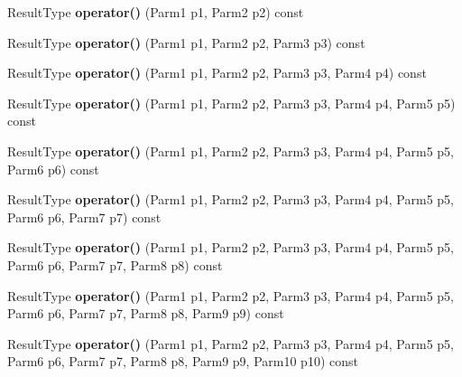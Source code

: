 \begin{DoxyCompactItemize}
\item 
\hypertarget{classLoki_1_1Functor_a0c67dcf45e65d989bb07cb0908388494}{}Result\+Type {\bfseries operator()} (Parm1 p1, Parm2 p2) const \label{classLoki_1_1Functor_a0c67dcf45e65d989bb07cb0908388494}

\item 
\hypertarget{classLoki_1_1Functor_afc585c0d27c60cd352ed4fe30ff5bd4a}{}Result\+Type {\bfseries operator()} (Parm1 p1, Parm2 p2, Parm3 p3) const \label{classLoki_1_1Functor_afc585c0d27c60cd352ed4fe30ff5bd4a}

\item 
\hypertarget{classLoki_1_1Functor_adcdf738d07fbab4934d6dad909d806b7}{}Result\+Type {\bfseries operator()} (Parm1 p1, Parm2 p2, Parm3 p3, Parm4 p4) const \label{classLoki_1_1Functor_adcdf738d07fbab4934d6dad909d806b7}

\item 
\hypertarget{classLoki_1_1Functor_aca8a8ae698c31fc85d314f8a203c8bfa}{}Result\+Type {\bfseries operator()} (Parm1 p1, Parm2 p2, Parm3 p3, Parm4 p4, Parm5 p5) const \label{classLoki_1_1Functor_aca8a8ae698c31fc85d314f8a203c8bfa}

\item 
\hypertarget{classLoki_1_1Functor_aae836737b383c0acf5bac68ee658dcca}{}Result\+Type {\bfseries operator()} (Parm1 p1, Parm2 p2, Parm3 p3, Parm4 p4, Parm5 p5, Parm6 p6) const \label{classLoki_1_1Functor_aae836737b383c0acf5bac68ee658dcca}

\item 
\hypertarget{classLoki_1_1Functor_acd877a04cd2c41b9a6609491bb5ff7a7}{}Result\+Type {\bfseries operator()} (Parm1 p1, Parm2 p2, Parm3 p3, Parm4 p4, Parm5 p5, Parm6 p6, Parm7 p7) const \label{classLoki_1_1Functor_acd877a04cd2c41b9a6609491bb5ff7a7}

\item 
\hypertarget{classLoki_1_1Functor_ad54fb9d693fc0d388a5289eeac19104b}{}Result\+Type {\bfseries operator()} (Parm1 p1, Parm2 p2, Parm3 p3, Parm4 p4, Parm5 p5, Parm6 p6, Parm7 p7, Parm8 p8) const \label{classLoki_1_1Functor_ad54fb9d693fc0d388a5289eeac19104b}

\item 
\hypertarget{classLoki_1_1Functor_a32c06f9f15e37dc6a9597b69170b21ce}{}Result\+Type {\bfseries operator()} (Parm1 p1, Parm2 p2, Parm3 p3, Parm4 p4, Parm5 p5, Parm6 p6, Parm7 p7, Parm8 p8, Parm9 p9) const \label{classLoki_1_1Functor_a32c06f9f15e37dc6a9597b69170b21ce}

\item 
\hypertarget{classLoki_1_1Functor_a7d541fc7e5ef8ed7b339baf4c736548f}{}Result\+Type {\bfseries operator()} (Parm1 p1, Parm2 p2, Parm3 p3, Parm4 p4, Parm5 p5, Parm6 p6, Parm7 p7, Parm8 p8, Parm9 p9, Parm10 p10) const \label{classLoki_1_1Functor_a7d541fc7e5ef8ed7b339baf4c736548f}


\end{DoxyCompactItemize}
